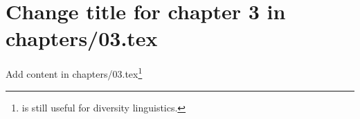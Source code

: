 \chapter{Change title for chapter 3 in chapters/03.tex}
Add content in chapters/03.tex\footnote{\citet{Comrie1981} is still useful for diversity linguistics. }